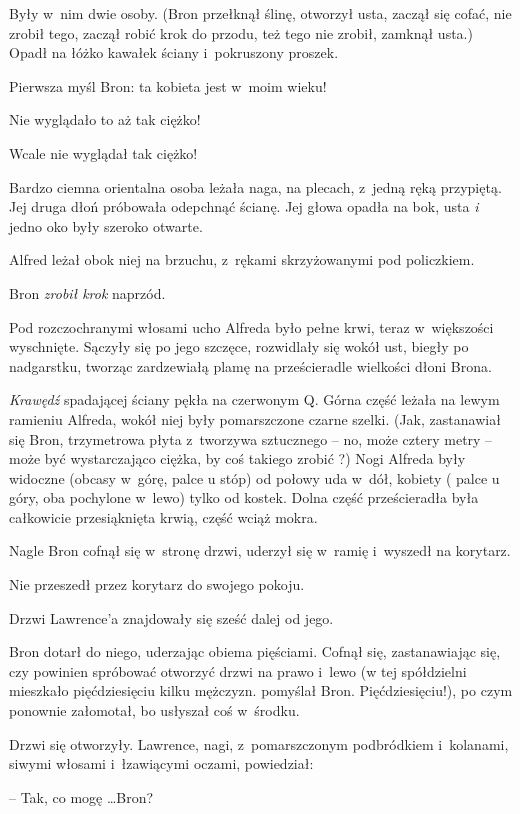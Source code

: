 \documentclass[oneside,polish,11pt,rmheadings]{mwbk}
\begin{document}
Były w~nim dwie osoby. (Bron przełknął ślinę, otworzył usta, zaczął się cofać, nie zrobił tego, zaczął robić krok do przodu, też tego nie zrobił, zamknął usta.) Opadł na łóżko kawałek ściany i~pokruszony proszek. 

Pierwsza myśl Bron: ta kobieta jest w~moim wieku! 

Nie wyglądało to aż tak ciężko! 

Wcale nie wyglądał tak ciężko! 

Bardzo ciemna orientalna osoba leżała naga, na plecach, z~jedną ręką przypiętą. Jej druga dłoń próbowała odepchnąć ścianę. Jej głowa opadła na bok, usta \textit{i }jedno oko były szeroko otwarte. 

Alfred leżał obok niej na brzuchu, z~rękami skrzyżowanymi pod policzkiem. 

Bron \textit{zrobił krok }naprzód. 

Pod rozczochranymi włosami ucho Alfreda było pełne krwi, teraz w~większości wyschnięte. Sączyły się po jego szczęce, rozwidlały się wokół ust, biegły po nadgarstku, tworząc zardzewiałą plamę na prześcieradle wielkości dłoni Brona. 

\textit{Krawędź }spadającej ściany pękła na czerwonym Q. Górna część leżała na lewym ramieniu Alfreda, wokół niej były pomarszczone czarne szelki. (Jak, zastanawiał się Bron, trzymetrowa płyta z~tworzywa sztucznego -- no, może cztery metry -- może być wystarczająco ciężka, by coś takiego zrobić ?) Nogi Alfreda były widoczne (obcasy w~górę, palce u stóp) od połowy uda w~dół, kobiety ( palce u góry, oba pochylone w~lewo) tylko od kostek. Dolna część prześcieradła była całkowicie przesiąknięta krwią, część wciąż mokra. 

Nagle Bron cofnął się w~stronę drzwi, uderzył się w~ramię i~wyszedł na korytarz. 

Nie przeszedł przez korytarz do swojego pokoju. 

Drzwi Lawrence'a znajdowały się sześć dalej od jego. 

Bron dotarł do niego, uderzając obiema pięściami. Cofnął się, zastanawiając się, czy powinien spróbować otworzyć drzwi na prawo i~lewo (w tej spółdzielni mieszkało pięćdziesięciu kilku mężczyzn. pomyślał Bron. Pięćdziesięciu!), po czym ponownie załomotał, bo usłyszał coś w~środku. 

Drzwi się otworzyły. Lawrence, nagi, z~pomarszczonym podbródkiem i~kolanami, siwymi włosami i~łzawiącymi oczami, powiedział: 

-- Tak, co mogę \ldots   Bron? 
\end{document}

